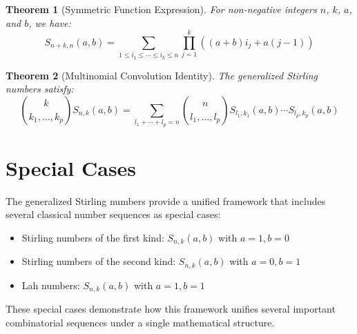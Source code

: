 \documentclass{article}
\newtheorem{theorem}{Theorem}
\newcommand{\gsn}[2]{S_{#1,#2}(a,b)}
\begin{document}
\begin{theorem}[Symmetric Function Expression]
For non-negative integers $n$, $k$, $a$, and $b$, we have:
\begin{equation}
\gsn{n+k}{n} = \sum_{1\leq i_1\leq \cdots \leq i_k\leq n}\prod_{j=1}^{k}\left((a+b)i_j + a(j-1)\right)
\end{equation}
\end{theorem}

\begin{theorem}[Multinomial Convolution Identity]
The generalized Stirling numbers satisfy:
\begin{equation}
\binom{k}{k_1,\ldots,k_p}\gsn{n}{k} = \sum_{l_1+\cdots+l_p=n}\binom{n}{l_1,\ldots,l_p}\gsn{l_1}{k_1}\cdots \gsn{l_p}{k_p}
\end{equation}
\end{theorem}

\section{Special Cases}

The generalized Stirling numbers provide a unified framework that includes several classical number sequences as special cases:

\begin{itemize}
    \item Stirling numbers of the first kind: $\gsn{n}{k}$ with $a=1, b=0$
    \item Stirling numbers of the second kind: $\gsn{n}{k}$ with $a=0, b=1$
    \item Lah numbers: $\gsn{n}{k}$ with $a=1, b=1$
\end{itemize}

These special cases demonstrate how this framework unifies several important combinatorial sequences under a single mathematical structure.
\end{document}
